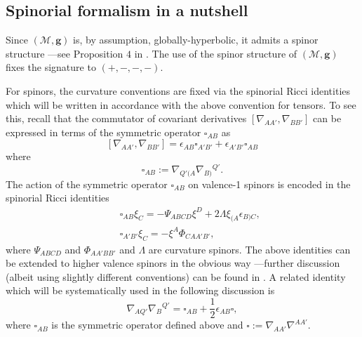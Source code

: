 \documentclass[10pt,a4paper]{article}
\theoremstyle{plain}
\def\bmg{{\bm g}}
\begin{document}
\subsection{Spinorial formalism in a nutshell}
\label{NotationAndSpinorFormalism}

Since $(\mathcal{M}, \bmg)$ is, by assumption, globally-hyperbolic, it
admits a spinor structure ---see Proposition $4$ in
\cite{CFEbook}. The use of the spinor structure of $(\mathcal{M},
\bmg)$ fixes the signature to $(+, -, -, -)$.

\medskip

For spinors, the curvature conventions are fixed via the spinorial
Ricci identities which will be written in accordance with the above
convention for tensors.  To see this, recall that the commutator of
covariant derivatives $[ \nabla_{AA'},\nabla_{BB'}]$ can be expressed
in terms of the symmetric operator $\square_{AB}$ as
\[
[ \nabla_{AA'},\nabla_{BB'}]= \epsilon_{AB}\square_{A'B'} +
\epsilon_{A'B'}\square_{AB}
\]
where
\[
\square_{AB} := \nabla_{Q'(A} \nabla_{B)}{}^{Q'}.
\]
 The action of the symmetric operator $\square_{AB}$ on valence-1
 spinors is encoded in the spinorial Ricci identities
\begin{subequations}
\begin{eqnarray}
&& \square_{AB}\xi_{C}=-\Psi_{ABCD} \xi^{D} +
  2\Lambda\xi_{(A}\epsilon_{B)C},
 \label{SpinorialRicciIdentities1} \\
&& \square_{A'B'}\xi_{C}=-\xi^{A}\Phi_{CA A' B'},
\label{SpinorialRicciIdentities2}
\end{eqnarray}
\end{subequations}
where $\Psi_{ABCD}$ and $\Phi_{AA'BB'}$ and $\Lambda$ are curvature
spinors.  The above identities can be extended to higher valence
spinors in the obvious way ---further discussion (albeit using
slightly different conventions) can be found in \cite{Ste91}. A
related identity which will be systematically used in the following
discussion is
\begin{equation}\label{DecomposeDoubleDerivativeContracted}
\nabla_{AQ'}\nabla_{B}{}^{Q'}=\square_{AB}+
\frac{1}{2}\epsilon_{AB}\square,
\end{equation}
where $\square_{AB}$ is the symmetric operator defined above and
$\square := \nabla_{AA'}\nabla^{AA'}.$
\end{document}

